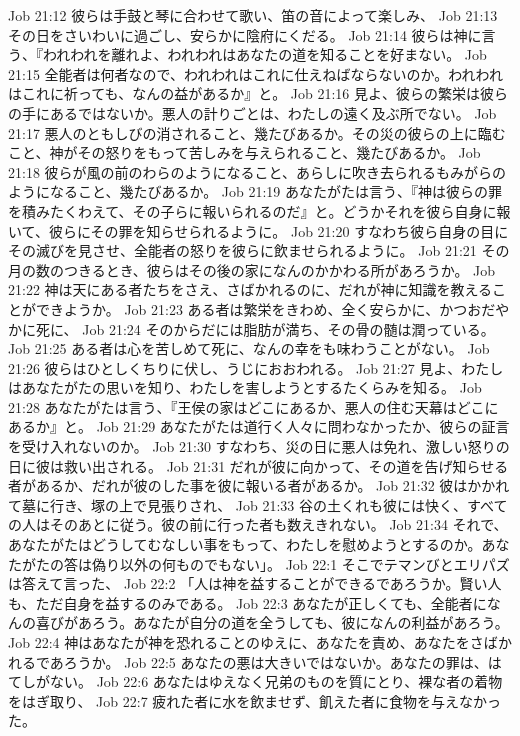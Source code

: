 Job 21:12  彼らは手鼓と琴に合わせて歌い、笛の音によって楽しみ、
Job 21:13  その日をさいわいに過ごし、安らかに陰府にくだる。
Job 21:14  彼らは神に言う、『われわれを離れよ、われわれはあなたの道を知ることを好まない。
Job 21:15  全能者は何者なので、われわれはこれに仕えねばならないのか。われわれはこれに祈っても、なんの益があるか』と。
Job 21:16  見よ、彼らの繁栄は彼らの手にあるではないか。悪人の計りごとは、わたしの遠く及ぶ所でない。
Job 21:17  悪人のともしびの消されること、幾たびあるか。その災の彼らの上に臨むこと、神がその怒りをもって苦しみを与えられること、幾たびあるか。
Job 21:18  彼らが風の前のわらのようになること、あらしに吹き去られるもみがらのようになること、幾たびあるか。
Job 21:19  あなたがたは言う、『神は彼らの罪を積みたくわえて、その子らに報いられるのだ』と。どうかそれを彼ら自身に報いて、彼らにその罪を知らせられるように。
Job 21:20  すなわち彼ら自身の目にその滅びを見させ、全能者の怒りを彼らに飲ませられるように。
Job 21:21  その月の数のつきるとき、彼らはその後の家になんのかかわる所があろうか。
Job 21:22  神は天にある者たちをさえ、さばかれるのに、だれが神に知識を教えることができようか。
Job 21:23  ある者は繁栄をきわめ、全く安らかに、かつおだやかに死に、
Job 21:24  そのからだには脂肪が満ち、その骨の髄は潤っている。
Job 21:25  ある者は心を苦しめて死に、なんの幸をも味わうことがない。
Job 21:26  彼らはひとしくちりに伏し、うじにおおわれる。
Job 21:27  見よ、わたしはあなたがたの思いを知り、わたしを害しようとするたくらみを知る。
Job 21:28  あなたがたは言う、『王侯の家はどこにあるか、悪人の住む天幕はどこにあるか』と。
Job 21:29  あなたがたは道行く人々に問わなかったか、彼らの証言を受け入れないのか。
Job 21:30  すなわち、災の日に悪人は免れ、激しい怒りの日に彼は救い出される。
Job 21:31  だれが彼に向かって、その道を告げ知らせる者があるか、だれが彼のした事を彼に報いる者があるか。
Job 21:32  彼はかかれて墓に行き、塚の上で見張りされ、
Job 21:33  谷の土くれも彼には快く、すべての人はそのあとに従う。彼の前に行った者も数えきれない。
Job 21:34  それで、あなたがたはどうしてむなしい事をもって、わたしを慰めようとするのか。あなたがたの答は偽り以外の何ものでもない」。
Job 22:1  そこでテマンびとエリパズは答えて言った、
Job 22:2  「人は神を益することができるであろうか。賢い人も、ただ自身を益するのみである。
Job 22:3  あなたが正しくても、全能者になんの喜びがあろう。あなたが自分の道を全うしても、彼になんの利益があろう。
Job 22:4  神はあなたが神を恐れることのゆえに、あなたを責め、あなたをさばかれるであろうか。
Job 22:5  あなたの悪は大きいではないか。あなたの罪は、はてしがない。
Job 22:6  あなたはゆえなく兄弟のものを質にとり、裸な者の着物をはぎ取り、
Job 22:7  疲れた者に水を飲ませず、飢えた者に食物を与えなかった。
